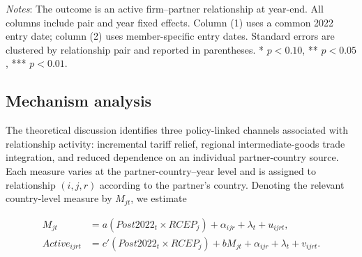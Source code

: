 \documentclass[preprint,12pt,authoryear]{elsarticle}
\begin{document}
\begin{table}[H]
\centering
\caption{Baseline results}
\label{tab:baseline}
\small
\begin{threeparttable}
\begin{tablenotes}[flushleft]
\item
\footnotesize \textit{Notes}: The outcome is an active firm--partner relationship at year-end. All columns include pair and year fixed effects. Column (1) uses a common 2022 entry date; column (2) uses member-specific entry dates. Standard errors are clustered by relationship pair and reported in parentheses. * $p<0.10$, ** $p<0.05$, *** $p<0.01$.
\end{tablenotes}
\end{threeparttable}
\end{table}
 
\subsection{Mechanism analysis}

The theoretical discussion identifies three policy-linked channels associated with relationship activity: incremental tariff relief, regional intermediate-goods trade integration, and reduced dependence on an individual partner-country source. Each measure varies at the partner-country--year level and is assigned to relationship $(i,j,r)$ according to the partner's country. Denoting the relevant country-level measure by $M_{jt}$, we estimate

\begin{align}
M_{jt} &= a(Post2022_t\times RCEP_j)+\alpha_{ijr}+\lambda_t+u_{ijrt}, \label{eq:mechanism_a}\\
Active_{ijrt} &= c'(Post2022_t\times RCEP_j)+bM_{jt}+\alpha_{ijr}+\lambda_t+v_{ijrt}. \label{eq:mechanism_b}
\end{align}
\end{document}

